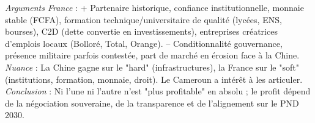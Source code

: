 \documentclass[11pt]{article}
\newcommand{\cle}[1]{{\popxbold\color{popdark}#1}}
\begin{document}
\begin{corrige}
\begin{enumerate}
\textit{Arguments France} : + Partenaire historique, confiance institutionnelle, monnaie stable (FCFA), formation technique/universitaire de qualité (lycées, ENS, bourses), C2D (dette convertie en investissements), entreprises créatrices d'emplois locaux (Bolloré, Total, Orange). -- Conditionnalité gouvernance, présence militaire parfois contestée, part de marché en érosion face à la Chine.
\textit{Nuance} : La Chine gagne sur le "hard" (infrastructures), la France sur le "soft" (institutions, formation, monnaie, droit). Le Cameroun a intérêt à les articuler.
\textit{Conclusion} : Ni l'une ni l'autre n'est "plus profitable" en absolu ; le profit dépend de la \cle{négociation souveraine}, de la \cle{transparence} et de l'\cle{alignement sur le PND 2030}.
\end{enumerate}
\end{corrige}
\end{document}
